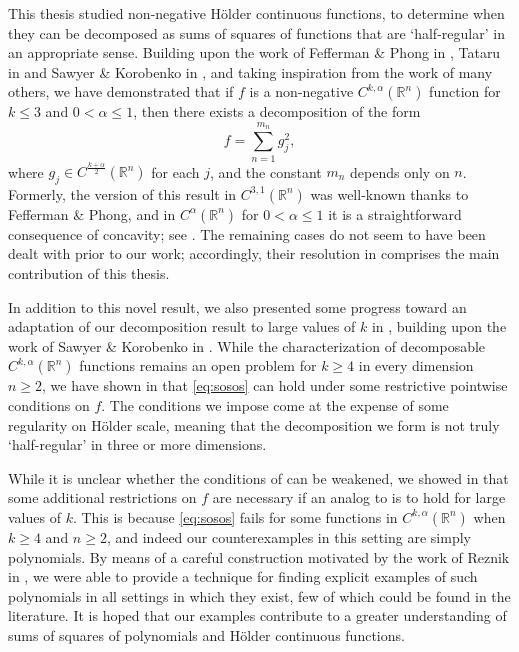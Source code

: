 \documentclass[oneside,hidelinks,indentfirst,10pt]{book}
\begin{document}
This thesis studied non-negative H\"older continuous functions, to determine when they can be decomposed as sums of squares of functions that are `half-regular' in an appropriate sense. Building upon the work of Fefferman \& Phong in \cite{Fefferman-Phong}, Tataru in \cite{Tataru} and Sawyer \& Korobenko in \cite{SOS_I}, and taking inspiration from the work of many others, we have demonstrated that if \(f\) is a non-negative \(C^{k,\alpha}(\mathbb{R}^n)\) function for \(k\leq 3\) and \(0<\alpha\leq 1\), then there exists a decomposition of the form
\begin{equation}\label{eq:sosos}
    f=\sum_{n=1}^{m_n}g_j^2,
\end{equation}
where \(g_j\in C^\frac{k+\alpha}{2}(\mathbb{R}^n)\) for each \(j\), and the constant \(m_n\) depends only on \(n\). Formerly, the version of this result in \(C^{3,1}(\mathbb{R}^n)\) was well-known thanks to Fefferman \& Phong, and in \(C^\alpha(\mathbb{R}^n)\) for \(0<\alpha\leq 1\) it is a straightforward consequence of concavity; see . The remaining cases do not seem to have been dealt with prior to our work; accordingly, their resolution in  comprises the main contribution of this thesis.


In addition to this novel result, we also presented some progress toward an adaptation of our decomposition result to large values of \(k\) in , building upon the work of Sawyer \& Korobenko in \cite{SOS_I}. While the characterization of decomposable \(C^{k,\alpha}(\mathbb{R}^n)\) functions remains an open problem for \(k\geq 4\) in every dimension \(n\geq 2\), we have shown in  that \eqref{eq:sosos} can hold under some restrictive pointwise conditions on \(f\). The conditions we impose come at the expense of some regularity on H\"older scale, meaning that the decomposition we form is not truly `half-regular' in three or more dimensions.


While it is unclear whether the conditions of  can be weakened, we showed in  that some additional restrictions on \(f\) are necessary if an analog to  is to hold for large values of \(k\). This is because \eqref{eq:sosos} fails for some functions in \(C^{k,\alpha}(\mathbb{R}^n)\) when \(k\geq 4\) and \(n\geq 2\), and indeed our counterexamples in this setting are simply polynomials. By means of a careful construction motivated by the work of Reznik in \cite{reznik_extpsd}, we were able to provide a technique for finding explicit examples of such polynomials in all settings in which they exist, few of which could be found in the literature. It is hoped that our examples contribute to a greater understanding of sums of squares of polynomials and H\"older continuous functions.
\end{document}

